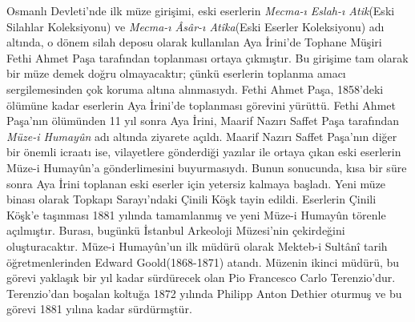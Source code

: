 \indent Osmanlı Devleti'nde ilk müze girişimi, eski eserlerin \textit{Mecma-ı Eslah-ı Atik}(Eski Silahlar Koleksiyonu) ve \textit{Mecma-ı Âsâr-ı Atîka}(Eski Eserler Koleksiyonu) adı altında, o dönem silah deposu olarak kullanılan  Aya İrini'de  Tophane Müşiri Fethi Ahmet Paşa tarafından toplanması ortaya çıkmıştır.\cite{degirmenci} Bu girişime tam olarak bir müze demek doğru olmayacaktır; çünkü eserlerin toplanma amacı sergilemesinden çok koruma altına alınmasıydı. Fethi Ahmet Paşa, 1858'deki ölümüne kadar eserlerin Aya İrini'de toplanması görevini yürüttü. Fethi Ahmet Paşa'nın ölümünden 11 yıl sonra Aya İrini, Maarif Nazırı Saffet Paşa tarafından \textit{Müze-i Humay\^{u}n} adı altında ziyarete açıldı. Maarif Nazırı Saffet Paşa'nın diğer bir önemli icraatı ise, vilayetlere gönderdiği yazılar ile ortaya çıkan eski eserlerin Müze-i Humay\^{u}n'a gönderlimesini buyurmasıydı. Bunun sonucunda, kısa bir süre sonra Aya İrini toplanan eski eserler için yetersiz kalmaya başladı. Yeni müze binası olarak Topkapı Sarayı'ndaki Çinili Köşk tayin edildi. Eserlerin Çinili Köşk'e taşınması 1881 yılında tamamlanmış ve yeni Müze-i Humay\^{u}n törenle açılmıştır. Burası, bugünkü İstanbul Arkeoloji Müzesi'nin çekirdeğini oluşturacaktır.
\indent Müze-i Humayûn'un ilk müdürü olarak Mekteb-i Sultânî tarih öğretmenlerinden  Edward Goold(1868-1871) atandı. Müzenin ikinci müdürü, bu görevi yaklaşık bir yıl kadar sürdürecek olan Pio Francesco Carlo Terenzio'dur. Terenzio'dan boşalan koltuğa 1872 yılında Philipp Anton Dethier oturmuş ve bu görevi 1881 yılına kadar sürdürmştür.\cite{saatci}